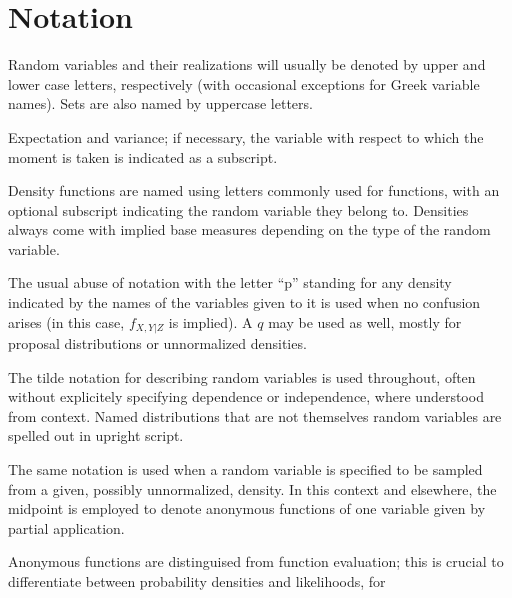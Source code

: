 \chapter*{Notation}
\label{cha:notation}

\begin{symbolicfootnotes}
  \begin{description}[style=nextline, leftmargin=4cm]
  \item[\(\Prob{\Theta \in A \given X = x}\)] Random variables and their realizations will usually be
    denoted by upper and lower case letters, respectively (with occasional exceptions for Greek
    variable names).  Sets are also named by uppercase letters.
  \item[{\(\Exp{X}, \Var[X]{f(X, Y)}\)}] Expectation and variance; if necessary, the variable with
    respect to which the moment is taken is indicated as a subscript.
  \item[\(\phi(x), f_{Z}(x)\)] Density functions are named using letters commonly used for functions,
    with an optional subscript indicating the random variable they belong to.  Densities always come
    with implied base measures depending on the type of the random variable.
  \item[\(\prob{x, y \given z}\)] The usual abuse of notation with the letter \enquote{p} standing for
    any density indicated by the names of the variables given to it is used when no confusion arises
    (in this case, \(f_{X,Y|Z}\) is implied).  A \(q\) may be used as well, mostly for proposal
    distributions or unnormalized densities.
  \item[{\(X_{i} \from \distr{Normal}(\mu, \sigma)\)}] The tilde notation for describing random
    variables is used throughout, often without explicitely specifying dependence or independence,
    where understood from context.  Named distributions that are not themselves random variables are
    spelled out in upright script.
  \item[{\(Y \from q(\cdot, X_{i-1})\)}] The same notation is used when a random variable is specified
    to be sampled from a given, possibly unnormalized, density.  In this context and elsewhere, the
    midpoint is employed to denote anonymous functions of one variable given by partial application.
  \item[{\(y \mapsto \prob{x \given y, z}\)}] Anonymous functions are distinguised from function
    evaluation; this is crucial to differentiate between probability densities and likelihoods, for

\end{description}
\end{symbolicfootnotes}
